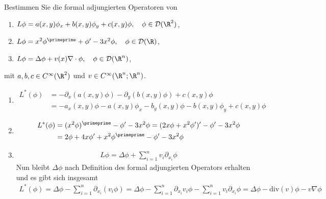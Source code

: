 
\begin{exercise}

Bestimmen Sie die formal adjungierten Operatoren von
\begin{enumerate}[label = (\roman*)]
  \item $L\phi = a(x,y)\phi_x + b(x,y)\phi_y + c(x,y)\phi, \quad \phi \in \mathcal{D}(\R^2)$,
  \item $L\phi = x^2\phi^{\primeprime} + \phi^{\prime} - 3x^2\phi, \quad \phi \in \mathcal{D}(\R)$,
  \item $L\phi = \Delta\phi + v(x)\nabla \cdot \phi, \quad \phi \in \mathcal{D}(\R^n)$,
\end{enumerate}
mit $a,b,c \in C^{\infty}(\R^2)$ und $v \in C^{\infty}(\R^n;\R^n)$.

\end{exercise}


\begin{solution}

\phantom{}

\begin{enumerate}[label = (\roman*)]
  \item
  \begin{align*}
    L^*(\phi)
    &=
    - \partial_x(a(x,y) \phi) - \partial_y(b(x,y) \phi) + c(x,y) \phi \\
    &=
    -a_x(x,y)\phi - a(x,y)\phi_x - b_y(x,y)\phi - b(x,y)\phi_y + c(x,y)\phi
  \end{align*}
  \item
  \begin{align*}
    L^*(\phi) &= (x^2\phi)^{\primeprime} - \phi^{\prime} -3x^2\phi
    = (2x\phi + x^2\phi^{\prime})^{\prime} - \phi^{\prime} -3x^2\phi \\
    &= 2\phi + 4x\phi^{\prime} + x^2\phi^{\primeprime} - \phi^{\prime} -3x^2\phi
  \end{align*}
  \item
  \begin{align*}
    L \phi
    =
    \Delta \phi + \sum_{i=1}^n v_i \partial_{x_i}\phi
  \end{align*}
  Nun bleibt $\Delta \phi$ nach Definition des formal adjungierten Operators erhalten und es gibt sich insgesamt
  \begin{align*}
    L^*(\phi)
    =
    \Delta \phi - \sum_{i=1}^n \partial_{x_i}(v_i \phi)
    =
    \Delta \phi - \sum_{i=1}^n \partial_{x_i} v_i \phi - \sum_{i=1}^n v_i \partial_{x_i} \phi
    =
    \Delta\phi -\mathrm{div}(v)\phi - v\nabla\phi
  \end{align*}
\end{enumerate}

\end{solution}

